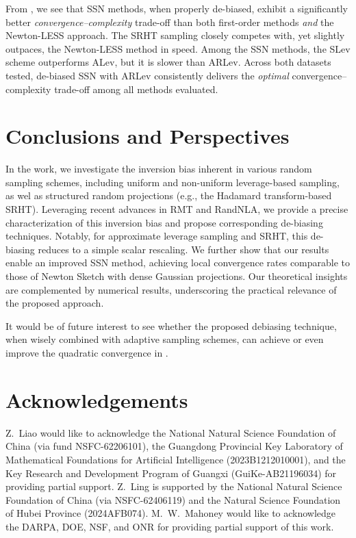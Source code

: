 \documentclass[11pt,a4paper]{article}
\begin{document}
From , we see that SSN methods, when properly de-biased, exhibit a significantly better \emph{convergence--complexity} trade-off than both first-order methods \emph{and} the Newton-LESS approach.
The SRHT sampling closely competes with, yet slightly outpaces, the Newton-LESS method in speed. 
Among the SSN methods, the SLev scheme outperforms ALev, but it is slower than ARLev. 
Across both datasets tested, de-biased SSN with ARLev consistently delivers the \emph{optimal} convergence–complexity trade-off among all methods evaluated.



\section{Conclusions and Perspectives}
\label{sec:conclusion} 

In the work, we investigate the inversion bias inherent in various random sampling schemes, including uniform and non-uniform leverage-based sampling, as wel as structured random projections (e.g., the Hadamard transform-based SRHT). 
Leveraging recent advances in RMT and RandNLA, we provide a precise characterization of this inversion bias and propose corresponding de-biasing techniques. 
Notably, for approximate leverage sampling and SRHT, this de-biasing reduces to a simple scalar rescaling.
We further show that our results enable an improved SSN method, achieving local convergence rates comparable to those of Newton Sketch with dense Gaussian projections. 
Our theoretical insights are complemented by numerical results, underscoring the practical relevance of the proposed approach.

It would be of future interest to see whether the proposed debiasing technique, when wisely combined with adaptive sampling schemes, can achieve or even improve the quadratic convergence in \citet{lacotte2021adaptive}.


\section*{Acknowledgements}

Z.~Liao would like to acknowledge the National Natural Science Foundation of China (via fund NSFC-62206101),  the Guangdong Provincial Key Laboratory of Mathematical Foundations for Artificial Intelligence (2023B1212010001), and the Key Research and Development Program of Guangxi (GuiKe-AB21196034) for providing partial support.
Z.~Ling is supported by the National Natural Science Foundation of China (via NSFC-62406119) and the Natural Science Foundation of Hubei Province (2024AFB074).
M.~W.~Mahoney would like to acknowledge the DARPA, DOE, NSF, and ONR for providing partial support of this work.
\end{document}
